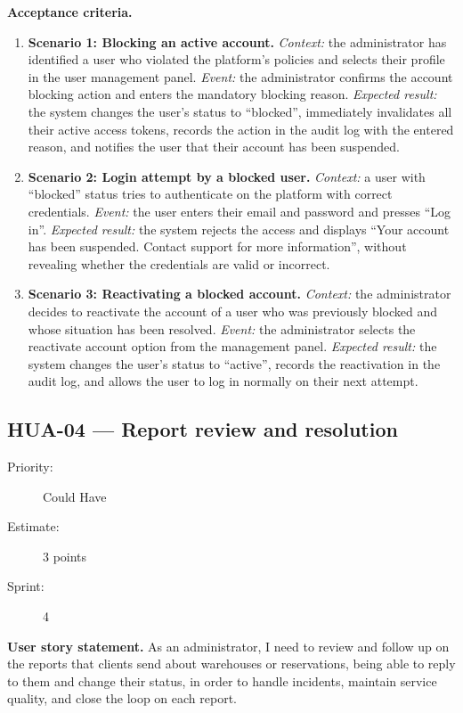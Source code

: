 \documentclass[11pt,a4paper,oneside]{report}
\begin{document}
\textbf{Acceptance criteria.}
\begin{enumerate}
\item \textbf{Scenario 1: Blocking an active account.} \emph{Context:} the administrator has identified a user who violated the platform's policies and selects their profile in the user management panel. \emph{Event:} the administrator confirms the account blocking action and enters the mandatory blocking reason. \emph{Expected result:} the system changes the user's status to ``blocked'', immediately invalidates all their active access tokens, records the action in the audit log with the entered reason, and notifies the user that their account has been suspended.
\item \textbf{Scenario 2: Login attempt by a blocked user.} \emph{Context:} a user with ``blocked'' status tries to authenticate on the platform with correct credentials. \emph{Event:} the user enters their email and password and presses ``Log in''. \emph{Expected result:} the system rejects the access and displays ``Your account has been suspended. Contact support for more information'', without revealing whether the credentials are valid or incorrect.
\item \textbf{Scenario 3: Reactivating a blocked account.} \emph{Context:} the administrator decides to reactivate the account of a user who was previously blocked and whose situation has been resolved. \emph{Event:} the administrator selects the reactivate account option from the management panel. \emph{Expected result:} the system changes the user's status to ``active'', records the reactivation in the audit log, and allows the user to log in normally on their next attempt.
\end{enumerate}

\subsection{HUA-04 --- Report review and resolution}
\label{req:HUA-04}
\begin{description}
\item[Priority:] Could Have \quad \item[Estimate:] 3 points \quad \item[Sprint:] 4
\end{description}

\textbf{User story statement.} As an administrator, I need to review and follow up on the reports that clients send about warehouses or reservations, being able to reply to them and change their status, in order to handle incidents, maintain service quality, and close the loop on each report.
\end{document}
